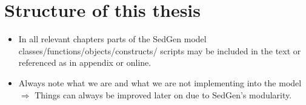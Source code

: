 \section{Structure of this thesis}
    \begin{itemize}
        \item In all relevant chapters parts of the SedGen model classes/functions/objects/constructs/ scripts may be included in the text or referenced as in appendix or online. %
        \item Always note what we are and what we are not implementing into the model \(\Rightarrow\) Things can always be improved later on due to SedGen’s modularity. %
    \end{itemize}









\cleardoublepage


